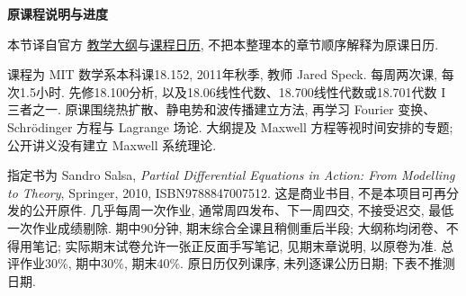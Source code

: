 {}
\begin{center}{\color{structurecolor}\bfseries\fontsize{14.4}{20}\selectfont 原课程说明与进度}\end{center}
本节译自官方 \href{https://ocw.mit.edu/courses/18-152-introduction-to-partial-differential-equations-fall-2011/pages/syllabus/}{教学大纲}与\href{https://ocw.mit.edu/courses/18-152-introduction-to-partial-differential-equations-fall-2011/pages/calendar/}{课程日历}, 不把本整理本的章节顺序解释为原课日历.

课程为 MIT 数学系本科课18.152, 2011年秋季, 教师 Jared Speck. 每周两次课, 每次1.5小时. 先修18.100分析, 以及18.06线性代数、18.700线性代数或18.701代数 I 三者之一. 原课围绕热扩散、静电势和波传播建立方法, 再学习 Fourier 变换、Schrödinger 方程与 Lagrange 场论. 大纲提及 Maxwell 方程等视时间安排的专题; 公开讲义没有建立 Maxwell 系统理论.

指定书为 Sandro Salsa, \textit{Partial Differential Equations in Action: From Modelling to Theory}, Springer, 2010, ISBN9788847007512. 这是商业书目, 不是本项目可再分发的公开原件. 几乎每周一次作业, 通常周四发布、下一周四交, 不接受迟交, 最低一次作业成绩剔除. 期中90分钟, 期末综合全课且稍侧重后半段; 大纲称均闭卷、不得用笔记; 实际期末试卷允许一张正反面手写笔记, 见期末章说明, 以原卷为准. 总评作业30\%, 期中30\%, 期末40\%. 原日历仅列课序, 未列逐课公历日期; 下表不推测日期.


